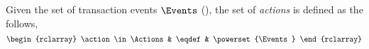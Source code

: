 
\begin{defn}[Actions]
Given the set of transaction events \( \Events \) (), the set of \emph{actions} is defined as the follows,
\[
    \begin{rclarray}
        \action \in \Actions & \eqdef & \powerset{\Events}
    \end{rclarray}
\]
\end{defn}

